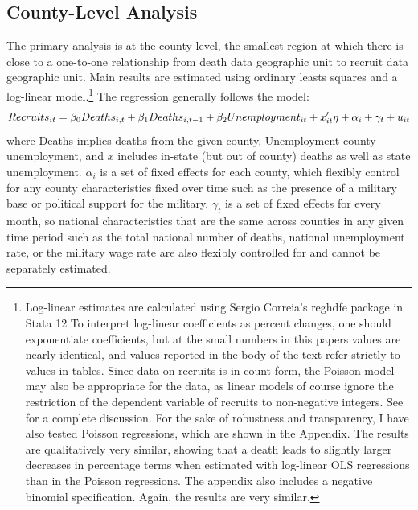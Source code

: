 \documentclass[12pt] {article}
\begin{document}
\subsection{County-Level Analysis\label{sub:County OLS}}

The primary analysis is at the county level, the smallest region at which there is close to a one-to-one relationship from death data geographic unit to recruit data geographic unit. Main results are estimated using ordinary leasts squares and a log-linear model.\footnote{Log-linear estimates are calculated using Sergio Correia's reghdfe package in Stata 12 \citep{reghdfe} To interpret log-linear coefficients as percent changes, one should exponentiate coefficients, but at the small numbers in this papers values are nearly identical, and values reported in the body of the text refer strictly to values in tables. Since data on recruits is in count form, the Poisson model may also be appropriate for the data, as linear models of course ignore the restriction of the dependent variable of recruits to non-negative integers. See \cite{cameron2013countdata} for a complete discussion. For the sake of robustness and transparency, I have also tested Poisson regressions, which are shown in the Appendix. The results are qualitatively very similar, showing that a death leads to slightly larger decreases in percentage terms when estimated with log-linear OLS regressions than in the Poisson regressions. The appendix also includes a negative binomial specification. Again, the results are very similar.} The regression generally follows the model:
$$Recruits_{it}=\beta_{0}Deaths_{i,t}+\beta_{1}Deaths_{i,t-1}+\beta_{2}Unemployment_{it}\\
+x'_{it}\eta+\alpha_{i}+\gamma_{t}+u_{it}$$
where Deaths implies deaths from the given county, Unemployment county unemployment, and $x$ includes in-state (but out of county) deaths as well as
state unemployment. $\alpha_{i}$ is a set of fixed effects for each county, which flexibly control for any county characteristics fixed over time such as the presence of a military base or political support for the military. $\gamma_{t}$ is a set of fixed effects for every month, so national characteristics that are the same across counties in any given time period such as the total national number of deaths, national
unemployment rate, or the military wage rate are also flexibly controlled for and cannot be separately estimated. 

\begin{table}
\caption{}
\label{Flo:loglinear}
\scalebox{0.9}{

}
\end{table}
\end{document}
